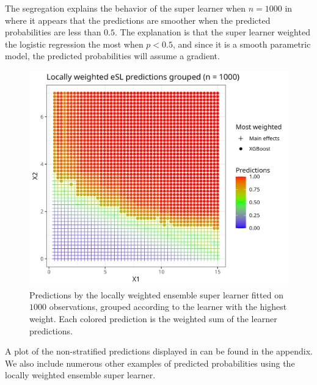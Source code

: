 \documentclass[./main.tex]{subfiles}
\begin{document}
The segregation explains the behavior of the super learner when $ n = 1000 $ in  where it appears that the predictions are smoother when the predicted probabilities are less than $ 0.5 $. The explanation is that the super learner weighted the logistic regression the most when $ p < 0.5 $, and since it is a smooth parametric model, the predicted probabilities will assume a gradient. 
\begin{figure}[H]
    \centering
    \includegraphics[width=\textwidth]{figures/esl_preds_lw_stratified.png}
    \caption{Predictions by the locally weighted ensemble super learner fitted on $ 1000 $ observations, grouped according to the learner with the highest weight. Each colored prediction is the weighted sum of the learner predictions.}
    \label{fig:esl_preds_lw_stratified}
\end{figure}
A plot of the non-stratified predictions displayed in  can be found in the appendix. We also include numerous other examples of predicted probabilities using the locally weighted ensemble super learner.
\end{document}
